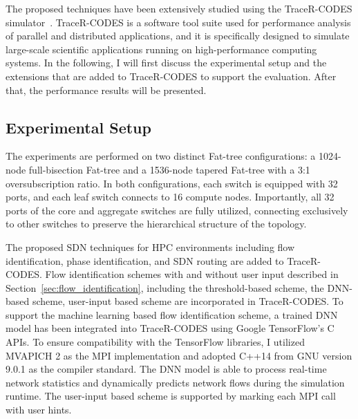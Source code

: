 The proposed techniques have been extensively studied using
the TraceR-CODES simulator~\cite{jain2016evaluating,mubarak2016enabling}.
TraceR-CODES is a software tool suite used for
performance analysis of parallel and distributed applications, and it
is specifically designed to simulate large-scale scientific applications
running on high-performance computing systems. In the following, I will first
discuss the experimental setup and the extensions that are added to
TraceR-CODES to support the evaluation. After that, the performance results
will be presented.

\subsection{Experimental Setup}

The experiments are performed on two distinct Fat-tree configurations:
a 1024-node full-bisection Fat-tree and a 1536-node tapered Fat-tree
with a 3:1 oversubscription ratio. In both configurations, each switch
is equipped with 32 ports, and each leaf switch connects to 16 compute
nodes. Importantly, all 32 ports of the core and aggregate switches are
fully utilized, connecting exclusively to other switches to preserve the
hierarchical structure of the topology.

The proposed SDN techniques for HPC environments including flow
identification, phase identification, and SDN routing are added to
TraceR-CODES. Flow identification schemes with and without user input
described in Section~\ref{sec:flow_identification}, including the
threshold-based scheme, the DNN-based scheme, user-input based scheme
are incorporated in TraceR-CODES. 
To support the machine learning based flow identification scheme,
a trained DNN model has been integrated
into TraceR-CODES using Google TensorFlow's C APIs. To ensure
compatibility with the TensorFlow libraries, I utilized
MVAPICH 2 as the MPI implementation and adopted C++14 from GNU
version 9.0.1 as the compiler standard. The DNN model is able to 
process real-time network statistics and  
dynamically predicts network flows during the simulation runtime.
The user-input based scheme is supported by marking each MPI call with
user hints. 


